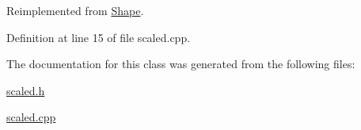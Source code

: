 Reimplemented from \hyperlink{class_shape_af26d06a96ece90a563795ec571451eb1}{Shape}.



Definition at line 15 of file scaled.\+cpp.



The documentation for this class was generated from the following files\+:\begin{DoxyCompactItemize}
\item 
\hyperlink{scaled_8h}{scaled.\+h}\item 
\hyperlink{scaled_8cpp}{scaled.\+cpp}\end{DoxyCompactItemize}
